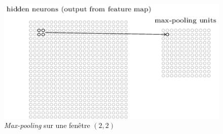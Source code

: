 \documentclass[10pt,a4paper]{report}
\begin{document}
		\begin{figure}[H]
			\begin{center}
				\includegraphics[scale=0.6]{Images/poolinglayer.png}
				\caption{\emph{Max-pooling} sur une fenêtre $(2,2)$}
			\end{center}
		\end{figure}
\end{document}

